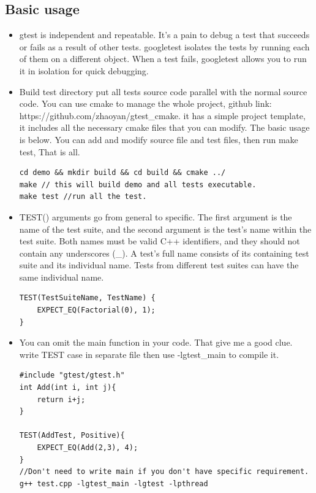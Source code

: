 \documentclass[a4paper,11pt,twoside]{book}
\begin{document}
\subsection{Basic usage}
\begin{itemize}
	\item gtest is independent and repeatable. It’s a pain to debug a test that succeeds or fails as a result of other tests. googletest isolates the tests by running each of them on a different object. When a test fails, googletest allows you to run it in isolation for quick debugging.
	
	\item Build test directory put all tests source code parallel with the normal source code. You can use cmake to manage the whole project,  github link: https://github.com/zhaoyan/gtest\_cmake. it has a simple project template, it includes all the necessary cmake files that you can modify. The basic usage is below. You can add and modify source file and test files, then run make test, That is all. 
\begin{lstlisting}
cd demo && mkdir build && cd build && cmake ../
make // this will build demo and all tests executable. 
make test //run all the test. 
\end{lstlisting}
	
	\item TEST() arguments go from general to specific. The first argument is the name of the test suite, and the second argument is the test’s name within the test suite. Both names must be valid C++ identifiers, and they should not contain any underscores (\_). A test’s full name consists of its containing test suite and its individual name. Tests from different test suites can have the same individual name.
	
\begin{lstlisting}
TEST(TestSuiteName, TestName) { 
	EXPECT_EQ(Factorial(0), 1);
}
\end{lstlisting}
	
	\item You can omit the main function in your code. That give me a good clue. write TEST case in separate file then use -lgtest\_main to compile it. 
	
\begin{lstlisting}
#include "gtest/gtest.h"
int Add(int i, int j){
	return i+j;
}

TEST(AddTest, Positive){
	EXPECT_EQ(Add(2,3), 4);
}
//Don't need to write main if you don't have specific requirement.
g++ test.cpp -lgtest_main -lgtest -lpthread
\end{lstlisting}


\end{itemize}
\end{document}
